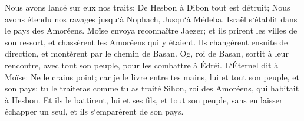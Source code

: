 \verse Nous avons lancé sur eux nos traits: De Hesbon à Dibon tout est détruit; Nous avons étendu nos ravages jusqu`à Nophach, Jusqu`à Médeba. 
\verse Israël s`établit dans le pays des Amoréens. 
\verse Moïse envoya reconnaître Jaezer; et ils prirent les villes de son ressort, et chassèrent les Amoréens qui y étaient. 
\verse Ils changèrent ensuite de direction, et montèrent par le chemin de Basan. Og, roi de Basan, sortit à leur rencontre, avec tout son peuple, pour les combattre à Édréi. 
\verse L`Éternel dit à Moïse: Ne le crains point; car je le livre entre tes mains, lui et tout son peuple, et son pays; tu le traiteras comme tu as traité Sihon, roi des Amoréens, qui habitait à Hesbon. 
\verse Et ils le battirent, lui et ses fils, et tout son peuple, sans en laisser échapper un seul, et ils s`emparèrent de son pays. 

\chapter{}

